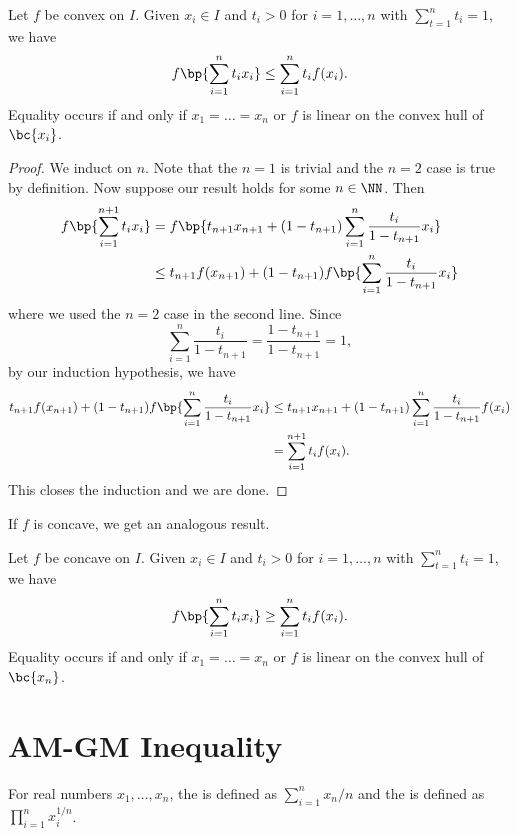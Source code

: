 \begin{theorem}
    Let $f$ be convex on $I$. Given $x_i \in I$ and $t_i > 0$ for $i = 1, \dots, n$ with $\sum_{t = 1}^n t_i = 1$, we have \[f\bp{\sum_{i = 1}^n t_i x_i} \leq \sum_{i = 1}^n t_i f(x_i).\] Equality occurs if and only if $x_1 = \dots = x_n$ or $f$ is linear on the convex hull of $\bc{x_i}$.
\end{theorem}
\begin{proof}
    We induct on $n$. Note that the $n = 1$ is trivial and the $n = 2$ case is true by definition. Now suppose our result holds for some $n \in \NN$. Then
    \begin{align*}
        f\bp{\sum_{i = 1}^{n+1} t_i x_i} &= f\bp{t_{n+1}x_{n+1} + (1-t_{n+1}) \sum_{i = 1}^n \frac{t_i}{1 - t_{n+1}} x_i}\\
        &\leq t_{n+1} f(x_{n+1}) + (1-t_{n+1}) f\bp{\sum_{i = 1}^n \frac{t_i}{1 - t_{n+1}} x_i}
    \end{align*}
    where we used the $n = 2$ case in the second line. Since \[\sum_{i = 1}^n \frac{t_i}{1 - t_{n+1}} = \frac{1 - t_{n+1}}{1 - t_{n+1}} = 1,\] by our induction hypothesis, we have
    \begin{align*}
        t_{n+1} f(x_{n+1}) + (1-t_{n+1}) f\bp{\sum_{i = 1}^n \frac{t_i}{1 - t_{n+1}} x_i} &\leq t_{n+1} x_{n+1} + (1-t_{n+1}) \sum_{i = 1}^n \frac{t_i}{1 - t_{n+1}} f(x_i)\\
        &= \sum_{i = 1}^{n+1} t_i f(x_i).
    \end{align*}
    This closes the induction and we are done.
\end{proof}

If $f$ is concave, we get an analogous result.

\begin{theorem}
    Let $f$ be concave on $I$. Given $x_i \in I$ and $t_i > 0$ for $i = 1, \dots, n$ with $\sum_{t = 1}^n t_i = 1$, we have \[f\bp{\sum_{i = 1}^n t_i x_i} \geq \sum_{i = 1}^n t_i f(x_i).\] Equality occurs if and only if $x_1 = \dots = x_n$ or $f$ is linear on the convex hull of $\bc{x_n}$.
\end{theorem}

\section{AM-GM Inequality}

\begin{definition}
    For real numbers $x_1, \dots, x_n$, the  is defined as $\sum_{i = 1}^n x_n/n$ and the  is defined as $\prod_{i = 1}^n x_i^{1/n}$.
\end{definition}

